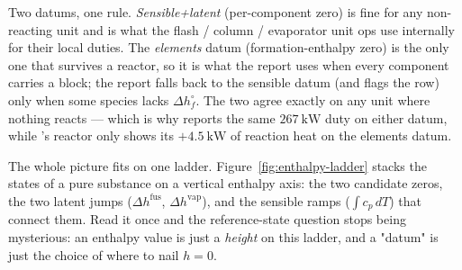 \documentclass[11pt,a4paper]{article}
\begin{document}
\begin{intuition}
Two datums, one rule.  \emph{Sensible+latent} (per-component zero) is
fine for any non-reacting unit and is what the flash / column /
evaporator unit ops use internally for their local duties.  The
\emph{elements} datum (formation-enthalpy zero) is the only one that
survives a reactor, so it is what the  report uses
when every component carries a  block; the report
falls back to the sensible datum (and flags the row) only when some
species lacks $\Delta h^{\circ}_f$.  The two agree exactly on any unit
where nothing reacts --- which is why  reports the same
$267~\mathrm{kW}$ duty on either datum, while 's
reactor only shows its $+4.5~\mathrm{kW}$ of reaction heat on the
elements datum.
\end{intuition}

The whole picture fits on one ladder.  Figure~\ref{fig:enthalpy-ladder}
stacks the states of a pure substance on a vertical enthalpy axis: the
two candidate zeros, the two latent jumps ($\Delta h^{\mathrm{fus}}$,
$\Delta h^{\mathrm{vap}}$), and the sensible ramps ($\int c_p\,dT$) that
connect them.  Read it once and the reference-state question stops being
mysterious: an enthalpy value is just a \emph{height} on this ladder,
and a "datum" is just the choice of where to nail $h=0$.
\end{document}
